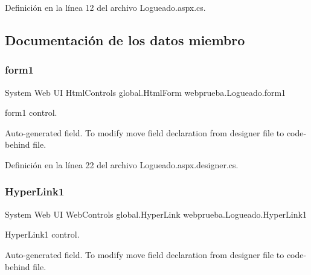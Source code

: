 Definición en la línea 12 del archivo Logueado.\+aspx.\+cs.


\begin{DoxyCode}{0}

\end{DoxyCode}


\subsection{Documentación de los datos miembro}
\mbox{\label{classwebprueba_1_1_logueado_a414ae0b7a8768f2b85096594268ceeda}} 
\subsubsection{\texorpdfstring{form1}{form1}}
{\footnotesize\ttfamily System Web UI Html\+Controls global.\+Html\+Form webprueba.\+Logueado.\+form1\hspace{0.3cm}{\ttfamily [protected]}}



form1 control. 

Auto-\/generated field. To modify move field declaration from designer file to code-\/behind file. 

Definición en la línea 22 del archivo Logueado.\+aspx.\+designer.\+cs.

\mbox{\label{classwebprueba_1_1_logueado_af725d5cb73a7f996b023ede8aa18a283}} 
\subsubsection{\texorpdfstring{HyperLink1}{HyperLink1}}
{\footnotesize\ttfamily System Web UI Web\+Controls global.\+Hyper\+Link webprueba.\+Logueado.\+Hyper\+Link1\hspace{0.3cm}{\ttfamily [protected]}}



Hyper\+Link1 control. 

Auto-\/generated field. To modify move field declaration from designer file to code-\/behind file. 

